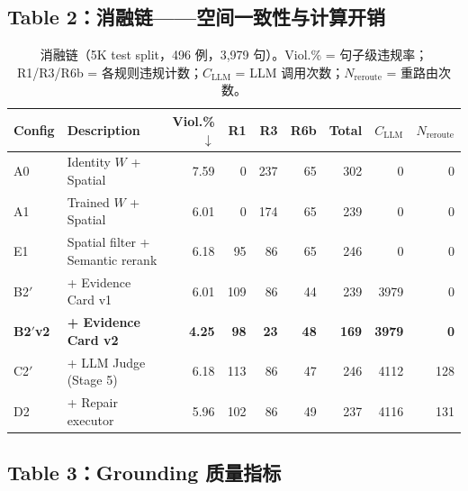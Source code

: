 \documentclass[11pt,a4paper]{article}
\theoremstyle{definition}
\begin{document}
\subsection{Table 2：消融链——空间一致性与计算开销}

\begin{table}[H]
\centering
\caption{消融链（5K test split，496 例，3{,}979 句）。Viol.\% = 句子级违规率；R1/R3/R6b = 各规则违规计数；$C_{\mathrm{LLM}}$ = LLM 调用次数；$N_{\mathrm{reroute}}$ = 重路由次数。}\label{tab:ablation_main}
\small
\begin{tabular}{@{}l l r r r r r r r@{}}
\toprule
\textbf{Config} & \textbf{Description} & \textbf{Viol.\%}$\downarrow$ & \textbf{R1} & \textbf{R3} & \textbf{R6b} & \textbf{Total} & $C_{\mathrm{LLM}}$ & $N_{\mathrm{reroute}}$ \\
\midrule
A0     & Identity $W$ + Spatial            & 7.59 &   0 & 237 & 65 & 302 &    0 &   0 \\
A1     & Trained $W$ + Spatial             & 6.01 &   0 & 174 & 65 & 239 &    0 &   0 \\
E1     & Spatial filter + Semantic rerank  & 6.18 &  95 &  86 & 65 & 246 &    0 &   0 \\
B2$'$  & + Evidence Card v1               & 6.01 & 109 &  86 & 44 & 239 & 3979 &   0 \\
\textbf{B2$'$v2} & \textbf{+ Evidence Card v2} & \textbf{4.25} & \textbf{98} & \textbf{23} & \textbf{48} & \textbf{169} & \textbf{3979} & \textbf{0} \\
C2$'$  & + LLM Judge (Stage 5)            & 6.18 & 113 &  86 & 47 & 246 & 4112 & 128 \\
D2     & + Repair executor                & 5.96 & 102 &  86 & 49 & 237 & 4116 & 131 \\
\bottomrule
\end{tabular}
\end{table}

\subsection{Table 3：Grounding 质量指标}
\end{document}
